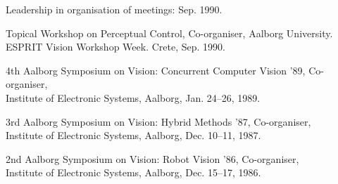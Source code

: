 \documentclass{article}
\begin{document}
\begin{cv}
\begin{cvlist}{Leadership in organisation of meetings:}
  \cftdotfill{\cftdotsep} Sep. 1990.
\item Topical Workshop on Perceptual Control, Co-organiser, Aalborg
  University. \\ ESPRIT Vision Workshop Week.  Crete,
  \cftdotfill{\cftdotsep} Sep. 1990.
\item 4th Aalborg Symposium on Vision: Concurrent Computer Vision '89,
  Co-organiser, \\ Institute of Electronic Systems, Aalborg,
  \cftdotfill{\cftdotsep} Jan. 24--26, 1989.
\item 3rd Aalborg Symposium on Vision: Hybrid Methods '87,
  Co-organiser, \\ Institute of Electronic Systems, Aalborg,
  \cftdotfill{\cftdotsep} Dec. 10--11, 1987.
\item 2nd Aalborg Symposium on Vision: Robot Vision '86, Co-organiser,
  \\ Institute of Electronic Systems, Aalborg, \cftdotfill{\cftdotsep}
  Dec. 15--17, 1986.
\end{cvlist}


\end{cv}
\end{document}
